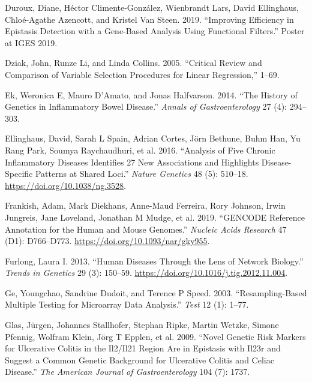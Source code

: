 \documentclass[
  11pt,
]{env/yjiao}
\newlength{\cslhangindent}
\newenvironment{cslreferences}%
  {\setlength{\parindent}{0pt}%
  \everypar{\setlength{\hangindent}{\cslhangindent}}\ignorespaces}%
  {\par}
\begin{document}
\begin{cslreferences}
\leavevmode\hypertarget{ref-duroux_2019_iges}{}%
Duroux, Diane, Héctor Climente-González, Wienbrandt Lars, David Ellinghaus, Chloé-Agathe Azencott, and Kristel Van Steen. 2019. ``Improving Efficiency in Epistasis Detection with a Gene-Based Analysis Using Functional Filters.'' Poster at IGES 2019.

\leavevmode\hypertarget{ref-Dziak2005}{}%
Dziak, John, Runze Li, and Linda Collins. 2005. ``Critical Review and Comparison of Variable Selection Procedures for Linear Regression,'' 1--69.

\leavevmode\hypertarget{ref-ek_history_2014}{}%
Ek, Weronica E, Mauro D'Amato, and Jonas Halfvarson. 2014. ``The History of Genetics in Inflammatory Bowel Disease.'' \emph{Annals of Gastroenterology} 27 (4): 294--303.

\leavevmode\hypertarget{ref-ellinghaus_analysis_2016}{}%
Ellinghaus, David, Sarah L Spain, Adrian Cortes, Jörn Bethune, Buhm Han, Yu Rang Park, Soumya Raychaudhuri, et al. 2016. ``Analysis of Five Chronic Inflammatory Diseases Identifies 27 New Associations and Highlights Disease-Specific Patterns at Shared Loci.'' \emph{Nature Genetics} 48 (5): 510--18. \url{https://doi.org/10.1038/ng.3528}.

\leavevmode\hypertarget{ref-frankish_gencode_2019}{}%
Frankish, Adam, Mark Diekhans, Anne-Maud Ferreira, Rory Johnson, Irwin Jungreis, Jane Loveland, Jonathan M Mudge, et al. 2019. ``GENCODE Reference Annotation for the Human and Mouse Genomes.'' \emph{Nucleic Acids Research} 47 (D1): D766--D773. \url{https://doi.org/10.1093/nar/gky955}.

\leavevmode\hypertarget{ref-furlong_human_2013}{}%
Furlong, Laura I. 2013. ``Human Diseases Through the Lens of Network Biology.'' \emph{Trends in Genetics} 29 (3): 150--59. \url{https://doi.org/10.1016/j.tig.2012.11.004}.

\leavevmode\hypertarget{ref-ge2003resampling}{}%
Ge, Youngchao, Sandrine Dudoit, and Terence P Speed. 2003. ``Resampling-Based Multiple Testing for Microarray Data Analysis.'' \emph{Test} 12 (1): 1--77.

\leavevmode\hypertarget{ref-glas2009novel}{}%
Glas, Jürgen, Johannes Stallhofer, Stephan Ripke, Martin Wetzke, Simone Pfennig, Wolfram Klein, Jörg T Epplen, et al. 2009. ``Novel Genetic Risk Markers for Ulcerative Colitis in the Il2/Il21 Region Are in Epistasis with Il23r and Suggest a Common Genetic Background for Ulcerative Colitis and Celiac Disease.'' \emph{The American Journal of Gastroenterology} 104 (7): 1737.


\end{cslreferences}
\end{document}
